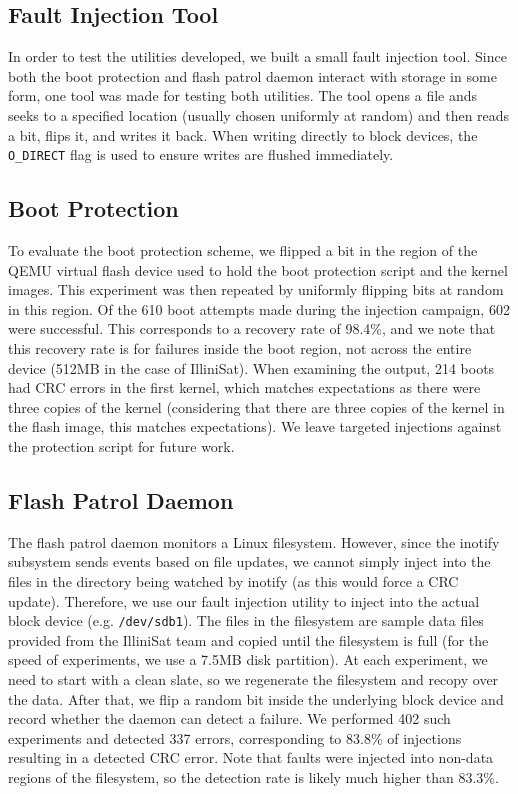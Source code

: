 \subsection{Fault Injection Tool}

In order to test the utilities developed, we built a small fault injection
tool.  Since both the boot protection and flash patrol daemon interact with
storage in some form, one tool was made for testing both utilities.  The tool
opens a file ands seeks to a specified location (usually chosen uniformly at
random) and then reads a bit, flips it, and writes it back.  When writing
directly to block devices, the {\texttt {O\_DIRECT}} flag is used to ensure
writes are flushed immediately.

\subsection{Boot Protection}
To evaluate the boot protection scheme, we flipped a bit in the region of the
QEMU virtual flash device used to hold the boot protection script and the kernel
images.  This experiment was then repeated by uniformly flipping bits at random
in this region.  Of the 610 boot attempts made during the injection campaign,
602 were successful.  This corresponds to a recovery rate of 98.4\%, and we note
that this recovery rate is for failures inside the boot region, not across the
entire device (512MB in the case of IlliniSat).  When examining the output, 214
boots had CRC errors in the first kernel, which matches expectations as there
were three copies of the kernel (considering that there are three copies of the
kernel in the flash image, this matches expectations).  We leave targeted
injections against the protection script for future work.

\subsection{Flash Patrol Daemon}
The flash patrol daemon monitors a Linux filesystem.  However, since the
inotify subsystem sends events based on file updates, we cannot simply
inject into the files in the directory being watched by inotify (as this would
force a CRC update). Therefore, we use our fault injection utility to inject
into the actual block device (e.g.  \texttt{/dev/sdb1}).  The files in the
filesystem are sample data files provided from the IlliniSat team and copied
until the filesystem is full (for the speed of experiments, we use a 7.5MB disk
partition).  At each experiment, we need to start with a clean slate, so we
regenerate the filesystem and recopy over the data.  After that, we flip a
random bit inside the underlying block device and record whether the daemon can
detect a failure.  We performed 402 such experiments and detected 337 errors,
corresponding to 83.8\% of injections resulting in a detected CRC error.
Note that faults were injected into non-data regions of the filesystem, so the
detection rate is likely much higher than 83.3\%.
